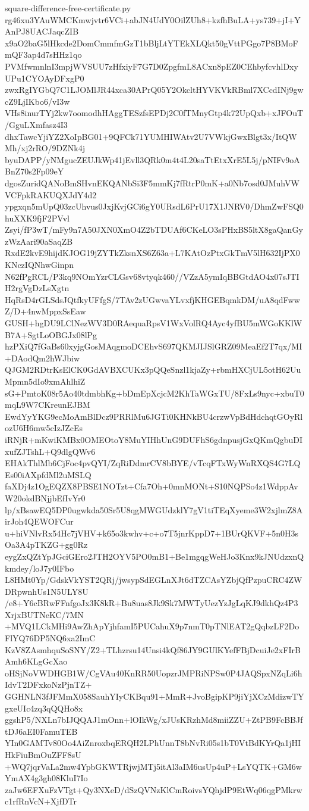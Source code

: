 \documentclass[11pt]{article}
\theoremstyle{definition}
\theoremstyle{remark}
\begin{document}
\begin{filecontents*}[overwrite]{square-difference-free-certificate.py}
rg46xu3YAuWMCKmwjvtr6VCi+abJN4UdY0OilZUh8+kzfhBuLA+ys739+jI+YAnPJ8UACJaqcZIB
x9aO2baG5lHkcde2DomCmmfmGzT1bBljLtYTEkXLQkt50gVttPGgo7P8BMoFmQF3ap4d7sHHz1qo
PVMfwmnlnI3mpjWVSUU7zHfxiyF7G7D0ZpgfmL8ACxn8pEZ0CEhbyfcvhlDxyUPu1CYOAyDFxgP0
zwxRgIYGbQ7C1LJOMlJR44xca30APrQ05Y2OkcltHYVKVkRBml7XCcdINj9gwcZ9LjIKbo6/vI3w
VHs8inurTYj2kw7oomodhHAggTESzfsEPDj2C0fTMnyGtp4k72UpQxb+xJFOuT/GguLXmfasz4I3
dhxTawcYjiYZ2XoIpBG01+9QFCk71YUMHIWAtv2U7VWkjGwxBlgt3x/ItQWMh/xj2rRO/9DZNk4j
byuDAPP/yNMgucZEUJkWp41jEvll3QRk0m4t4L20saTtEtxXrE5L5j/pNIFv9oABnZ70s2Fp09eY
dgosZuridQANoBmSHvnEKQANbSi3F5mmKj7fRtrP0mK+a0Nb7osd0JMuhVWVCFpkRAKUQXJdY4d2
ypgxqn5mUpQ03zcUhvus0JxjKvjGCi6gY0URsdL6PrU17X1JNRV0/DhmZwFSQ0huXXK9fjF2PVvl
Zsyi/fP3wT/mFy9n7A50JXN0XmO4Z2bTDUAf6CKeLO3sPHxBS5ltX8gaQanGyzWzAari90aSaqZB
RxdE2kvE9hijdKJOG19jZYTkZksnXS6Z63a+L7KAtOzPtxGkTmV5lH632IjPX0KNczIQNhwGinpn
N62fPgRCL/P3kq9NOmYzrCLGsv68vtyqk460//VZzA5ymIqBBGtdAO4x07sJTIH2rgVgDzLsXgtn
HqRsD4rGLSdsJQtfkyUFfgS/7TAv2zUGwvaYLvxfjKHGEBqmkDM/uA8qdFwwZ/D+4nwMppxSsEaw
GUSH+hgDU9LClNezWV3D0RAequaRpsV1WxVolRQ4Ayc4yfBU5mWGoKKlWB7A+SgtLoOBGJx08lPg
hzPXiQ7fGaBs60xyjgGosMAqgmoDCEhvS697QKMJIJSlGRZ09MeaEf2T7qx/MI+DAodQm2hWJbiw
QJGM2RDtrKsElCK0GdAVBXCUKx3pQQeSnzl1kjaZy+rbmHXCjUL5otH62UuMpmn5dIo9xmAhlhiZ
sG+PmtoK08r5Ao40tdmbhKg+bDmEpXcjcM2KhTaWGxTU/8FxLs9nyc+xbuT0mqL9W7CKreunEJBM
EwdYyYKG9ecMoAmBlDcz9PRRlMu6JGTi0KHNkBU4crzwVpBdHdchqtGOyRlozU6H6mw5cIzJZcEs
iRNjR+mKwiKMBx0OMEOtoY8MuYIHhUnG9DUFhS6gdnpusjGxQKmQgbuDIxufZJTshL+Q9dlgQWv6
EHAkThlMb6CjFoc4pvQYI/ZqRiDdmrCV8bBYE/vTcqFTxWyWnRXQS4G7LQEs00iAXpfdMl2uMSLQ
faXDj4z1OgEQZX8PBSE1NOTzt+Cfa7Oh+0mnMONt+S10NQPSo4z1WdppAvW20okdBNjjbEfIvYr0
lp/xBsawEQ5DP0ugwkda50Sr5U8qgMWGUdzklY7gV1tiTEqXyeme3W2xjlmZ8AirJoh4QEWOFCur
u+hiVNlvRx54Hc7jVHV+k65o3kwhv+c+o7T5jnrKppD7+1BUrQKVF+5n0H3sOa3A4pTKZG+gg0Rz
eygZxQZtYpJGciGEro2JTH2OYV5PO0mB1+Be1mgqgWeHJo3Knx9kJNUdzxnQkmdey/loJ7y0IFbo
L8HMt0Yp/GdskVkYST2QRj/jwsypSdEGLnXJt6dTZCAsYZbjQfPzpuCRC4ZWDRpwnhUs1N5ULY8U
/e8+Y6cBRwFFnfgoJx3K8kR+Bu8uas8Jk9Sk7MWTyUezYzJgLqKJ9dkhQz4P3XrjxBUTNeKC/7MN
+MVQ1LCkMHi9AwZhApYjhfamI5PUCahuX9p7nmT0pTNlEAT2gQqbzLF2DoFlYQ76DP5NQ6xa2ImC
KzV8ZAsmhquSoSNY/Z2+TLhzrsu14Unsi4kQf86JY9GUlKYefFBjDcuiJe2xFIrBAmh6KLgGcXao
oHSjNoVWDHGB1W/CgVAu40KnRR50UopzrJMPRiNPSw0P4JAQSpxNZqLi6hIdvT2DFxkoNzPjnTZ+
GGHNLN3fJFMmX058SauhYIyCKBqu91+MmR+JvoBgipKP9jiYjXCzMdizwTYgxeUIc4zq3qQQHo8x
ggshP5/NXLn7bIJQQAJ1mOnn+lOIkWg/xJUsKRzhMd8miiZZU+ZtPB9FcBBJftDJ6aEI0FamuTEB
YIn0GAMTv80Oo4AiZnroxbqERQH2LPhUnnT8bNvRi05s1bT0VtBdKYrQa1jHIHkFiuBmOuZFF8sU
+WQ7jqrVaLa2mw4YpbGKWTRjwjMTj5itAl3aIM6usUp4uP+LsYQTK+GM6wYmAX4g3gh08KluI7Io
zaJw6EFXuFzVTgt+Qy3NXeD/dSzQVNzKlCmRoivsYQhjdP9EtWq06qgPMkrwc1rfRnVcN+XjfDTr

\end{filecontents*}
\end{document}
